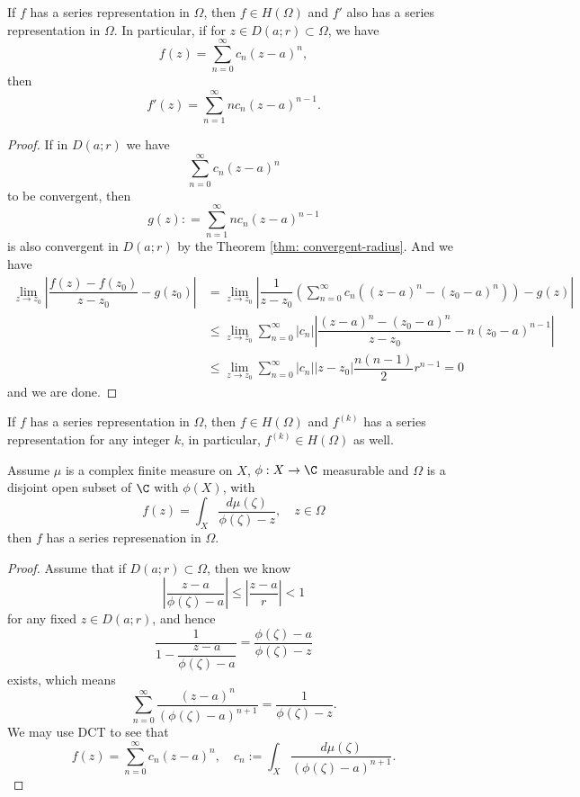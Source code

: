 \begin{theorem}
    If $f$ has a series representation in $\Omega$, then $f\in H(\Omega)$ and $f'$ also has a series representation in $\Omega$. In particular, if for $z\in D(a;r) \subset \Omega$, we have
    \[
    f(z) = \sum\limits_{n=0}^{\infty} c_n(z-a)^n,
    \]
    then
    \[
    f'(z) = \sum\limits_{n=1}^{\infty}nc_n(z-a)^{n-1}.
    \]
\end{theorem}
\begin{proof}
    If in $D(a;r)$ we have
    \[\sum\limits_{n=0}^{\infty} c_n(z-a)^n\]
    to be convergent, then
    \[
    g(z): = \sum\limits_{n=1}^{\infty}nc_n(z-a)^{n-1}
    \]
    is also convergent in $D(a;r)$ by  the Theorem \ref{thm: convergent-radius}. And we have
    \[
    \begin{aligned}
        \lim_{z\to z_0} \left|\dfrac{f(z) - f(z_0)}{z-z_0} - g(z_0)\right| & = \lim_{z\to z_0}\left|\dfrac{1}{z-z_0}\left(\sum\limits_{n=0}^{\infty} c_n\left((z-a)^n-(z_0-a)^n\right)\right) -g(z)\right|\\
        &\leq \lim_{z\to z_0}\sum\limits_{n=0}^{\infty}|c_n|\left|\dfrac{(z-a)^n - (z_0-a)^n}{z-z_0} -n(z_0-a)^{n-1}\right| \\
        &\leq \lim_{z\to z_0}\sum\limits_{n=0}^{\infty}|c_n||z-z_0|\dfrac{n(n-1)}{2}r^{n-1} = 0
    \end{aligned}
    \]
    and we are done.
\end{proof}

\begin{corollary}
    If $f$ has a series representation in $\Omega$, then $f\in H(\Omega)$ and $f^{(k)}$ has a series representation for any integer $k$, in particular, $f^{(k)} \in H(\Omega)$ as well.
\end{corollary}

\begin{theorem}
\label{thm: route-integral-holomorphic}
    Assume $\mu$ is a complex finite measure on $X$, $\phi:X \to \C$ measurable and $\Omega$ is a disjoint open subset of $\C$ with $\phi(X)$, with
    \[
    f(z) = \int_X \dfrac{d\mu(\zeta)}{\phi(\zeta)- z}, \quad z\in \Omega
    \]
    then $f$ has a series represenation in $\Omega$.
\end{theorem}
\begin{proof}
    Assume that if $D(a;r) \subset \Omega$, then we know
    \[
    \left|\dfrac{z-a}{\phi(\zeta) - a}\right| \leq \left|\dfrac{z-a}{r}\right| < 1
    \]
    for any fixed $z\in D(a;r)$, and hence
    \[
    \dfrac{1}{1-\dfrac{z-a}{\phi(\zeta) - a}} = \dfrac{\phi(\zeta) -a }{\phi(\zeta) - z} 
    \]
    exists, which means 
    \[
    \sum\limits_{n=0}^{\infty}\dfrac{(z-a)^n}{(\phi(\zeta)-a)^{n+1}} = \dfrac{1}{\phi(\zeta) - z}.
    \]
    We may use DCT to see that
    \[
    f(z) = \sum\limits_{n=0}^{\infty} c_n(z-a)^n,\quad c_n:= \int_X \dfrac{d\mu(\zeta)}{(\phi(\zeta) -a)^{n+1}}.
    \]
\end{proof}

